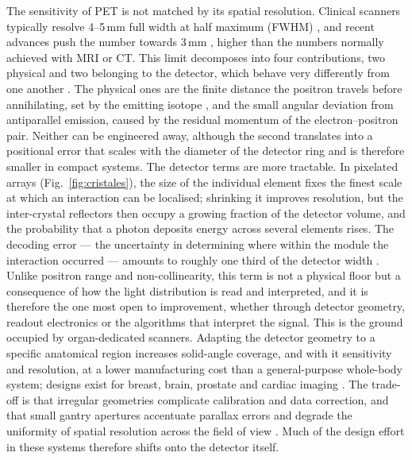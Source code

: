 \documentclass[10pt,conference]{IEEEtran}
\begin{document}
The sensitivity of PET is not matched by its spatial resolution. Clinical
scanners typically resolve 4--5\,mm full width at half maximum
(FWHM) \cite{spencer2021}, and
recent advances push the number towards 3\,mm \cite{spencer2021,
gonzalezmontoro2022brain}, higher than the numbers normally achieved with MRI or CT. This limit decomposes into four
contributions, two physical and two belonging to the detector, which behave
very differently from one another \cite{moses2011}. The physical ones are
the finite distance the positron travels before annihilating, set by the
emitting isotope \cite{levin1999}, and the small angular deviation from
antiparallel emission, caused by the residual momentum of the
electron--positron pair. Neither can be engineered away, although the second
translates into a positional error that scales with the diameter of the
detector ring and is therefore smaller in compact systems. The detector terms are more tractable. In pixelated arrays (Fig.~\ref{fig:cristales}), the size of the
individual element fixes the finest scale at which an interaction can be
localised; shrinking it improves resolution, but the inter-crystal
reflectors then occupy a growing fraction of the detector volume, and the
probability that a photon deposits energy across several elements rises.
The decoding error --- the uncertainty in determining where within the
module the interaction occurred --- amounts to roughly one third of the
detector width \cite{moses2011}. Unlike positron range and non-collinearity,
this term is not a physical floor but a consequence of how the light
distribution is read and interpreted, and it is therefore the one most open to improvement, whether through detector geometry, readout electronics or the algorithms that interpret
the signal.
This is the ground occupied by organ-dedicated scanners. Adapting the
detector geometry to a specific anatomical region increases solid-angle
coverage, and with it sensitivity and resolution, at a lower manufacturing
cost than a general-purpose whole-body system; designs exist for breast,
brain, prostate and cardiac imaging \cite{sanaat2024}. The trade-off is that
irregular geometries complicate calibration and data correction, and that
small gantry apertures accentuate parallax errors and degrade the uniformity
of spatial resolution across the field of view \cite{sanaat2024}. Much of
the design effort in these systems therefore shifts onto the detector
itself.
\end{document}
